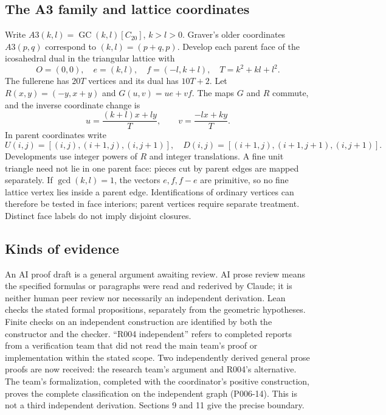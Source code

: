 \documentclass[11pt]{amsart}
\newcommand{\GC}{\operatorname{GC}}
\begin{document}
\subsection{The A3 family and lattice coordinates}
Write $A3(k,l)=\GC(k,l)[C_{20}]$, $k>l>0$. Graver's older coordinates
$A3(p,q)$ correspond to $(k,l)=(p+q,p)$. Develop each parent face of
the icosahedral dual in the triangular lattice with
\[
 O=(0,0),\quad e=(k,l),\quad f=(-l,k+l),\quad T=k^2+kl+l^2.
\]
The fullerene has $20T$ vertices and its dual has $10T+2$. Let
$R(x,y)=(-y,x+y)$ and $G(u,v)=ue+vf$. The maps $G$ and $R$ commute,
and the inverse coordinate change is
\begin{equation}\label{eq:1}
 u=\frac{(k+l)x+ly}{T},\qquad v=\frac{-lx+ky}{T}.\tag{1}
\end{equation}
In parent coordinates write
\[
 U(i,j)=[(i,j),(i+1,j),(i,j+1)],\quad
 D(i,j)=[(i+1,j),(i+1,j+1),(i,j+1)].
\]
Developments use integer powers of $R$ and integer translations. A fine
unit triangle need not lie in one parent face: pieces cut by parent
edges are mapped separately. If $\gcd(k,l)=1$, the vectors $e,f,f-e$
are primitive, so no fine lattice vertex lies inside a parent edge.
Identifications of ordinary vertices can therefore be tested in face
interiors; parent vertices require separate treatment. Distinct face
labels do not imply disjoint closures.

\subsection{Kinds of evidence}
An AI proof draft is a general argument awaiting review. AI prose review
means the specified formulas or paragraphs were read and rederived by
Claude; it is neither human peer review nor necessarily an independent
derivation. Lean checks the stated formal propositions, separately from
the geometric hypotheses. Finite checks on an independent construction
are identified by both the constructor and the checker. ``R004
independent'' refers to completed reports from a verification team that
did not read the main team's proof or implementation within the stated
scope. Two independently derived general prose proofs are now received:
the research team's argument and R004's alternative. The team's
formalization, completed with the coordinator's positive construction,
proves the complete classification on the independent graph (P006-14).
This is not a third independent derivation. Sections 9 and 11 give the precise boundary.
\end{document}
